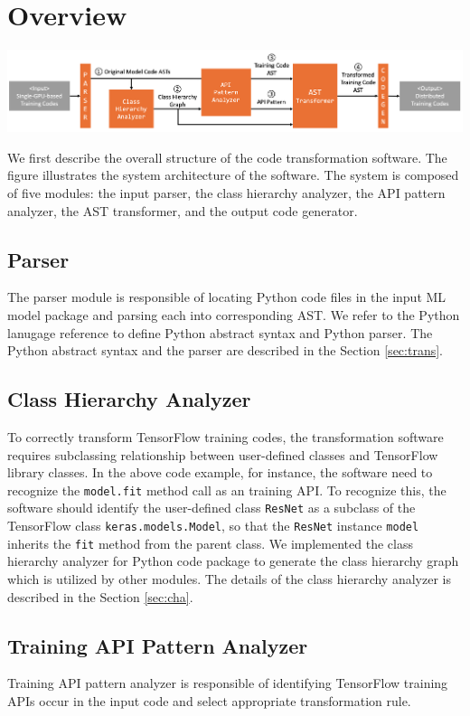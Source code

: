 \section{Overview}

\includegraphics[width=1\textwidth]{system_arch}

We first describe the overall structure of the code transformation software.
The figure illustrates the system architecture of the software.
The system is composed of five modules: the input parser,
the class hierarchy analyzer, the API pattern analyzer,
the AST transformer, and the output code generator.

\subsection{Parser}

The parser module is responsible of locating Python code files in the
input ML model package and parsing each into corresponding AST.
We refer to the Python lanugage reference\cite{pythonref}
to define Python abstract syntax and Python parser.
The Python abstract syntax and the parser 
are described in the Section \ref{sec:trans}.

\subsection{Class Hierarchy Analyzer}



To correctly transform TensorFlow training codes,
the transformation software requires subclassing relationship
between user-defined classes and TensorFlow library classes.
In the above code example, for instance, the software need to recognize
the {\tt model.fit} method call as an training API.
To recognize this, the software should identify the user-defined class
{\tt ResNet} as a subclass of the TensorFlow class {\tt keras.models.Model},
so that the {\tt ResNet} instance {\tt model} inherits the {\tt fit}
method from the parent class. 
We implemented the class hierarchy analyzer for Python code package
to generate the class hierarchy graph which is utilized by
other modules. The details of the class hierarchy analyzer is
described in the Section \ref{sec:cha}.

\subsection{Training API Pattern Analyzer}

Training API pattern analyzer is responsible of identifying
TensorFlow training APIs occur in the input code and select appropriate
transformation rule.



